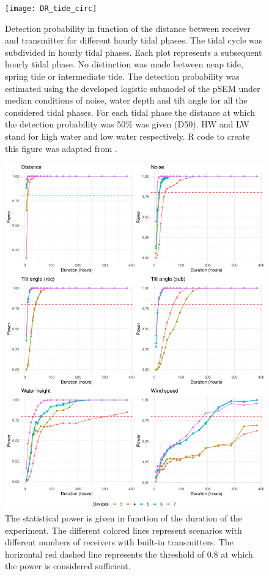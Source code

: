 \documentclass[doublespacing,linenumbers]{bmcart}
\begin{document}
\begin{backmatter}
\begin{figure}[h!]
  \texttt{[image: DR\_tide\_circ]}
  \caption{Detection probability in function of the distance between receiver and transmitter for different hourly tidal phases. The tidal cycle was subdivided in hourly tidal phases. Each plot represents a subsequent hourly tidal phase. No distinction was made between neap tide, spring tide or intermediate tide. The detection probability was estimated using the developed logistic submodel of the pSEM under median conditions of noise, water depth and tilt angle for all the considered tidal phases. For each tidal phase the distance at which the detection probability was 50\% was given (D50). HW and LW stand for high water and low water respectively. R code to create this figure was adapted from \cite{Goossens2022TakingAssessments}.}
  \label{fig:DR_tide_circ}
\end{figure}

\begin{figure}[h!]
  \includegraphics[scale=0.5]{Power_agg}
  \caption{
      The statistical power is given in function of the duration of the experiment. The different colored lines represent scenarios with different numbers of receivers with built-in transmitters. The horizontal red dashed line represents the threshold of 0.8 at which the power is considered sufficient. }
  \label{fig:Power_agg}
\end{figure}




\end{backmatter}
\end{document}
